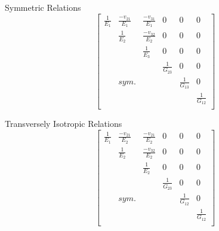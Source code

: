 \documentclass[10pt]{article}
\begin{document}
Symmetric Relations 
\[
  \begin{bmatrix}
  
    \frac{1}{E_1} & \frac{-v_{21}}{E_1} & \frac{-v_{31}}{E_1} & 0 & 0 & 0 \\
    & \frac{1}{E_2} & \frac{-v_{32}}{E_2} & 0 & 0 & 0 \\
    &  & \frac{1}{E_3}  & 0 & 0 & 0 \\
    & & & \frac{1}{G_{23}} & 0 & 0 \\
    & sym. & & & \frac{1}{G_{13}} & 0 \\
    & & & & & \frac{1}{G_{12}} \\
  \end{bmatrix}
\]


Transversely Isotropic Relations
\[
  \begin{bmatrix}
  
    \frac{1}{E_1} & \frac{-v_{21}}{E_2} & \frac{-v_{21}}{E_2} & 0 & 0 & 0 \\
    & \frac{1}{E_2} & \frac{-v_{32}}{E_2} & 0 & 0 & 0 \\
    &  & \frac{1}{E_2}  & 0 & 0 & 0 \\
    & & & \frac{1}{G_{23}} & 0 & 0 \\
    & sym. & & & \frac{1}{G_{12}} & 0 \\
    & & & & & \frac{1}{G_{12}} \\
  \end{bmatrix}
\]
\end{document}
